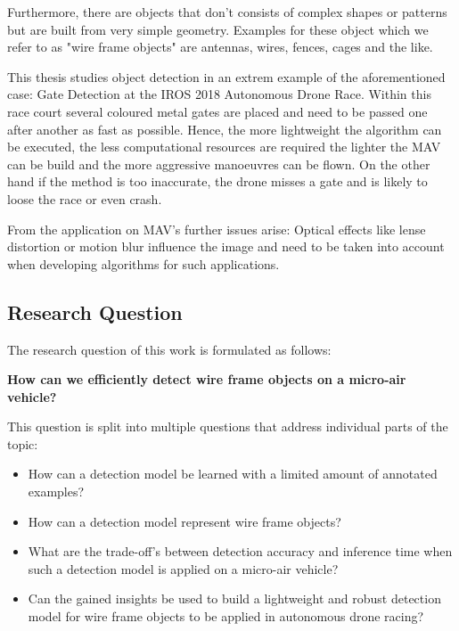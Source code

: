 Furthermore, there are objects that don't consists of complex shapes or patterns but are built from very simple geometry. Examples for these object which we refer to as "wire frame objects" are antennas, wires, fences, cages and the like.  

This thesis studies object detection in an extrem example of the aforementioned case: Gate Detection at the IROS 2018 Autonomous Drone Race. Within this race court several coloured metal gates are placed and need to be passed one after another as fast as possible. Hence, the more lightweight the algorithm can be executed, the less computational resources are required the lighter the \ac{MAV} can be build and the more aggressive manoeuvres can be flown. On the other hand if the method is too inaccurate, the drone misses a gate and is likely to loose the race or even crash.

From the application on MAV's further issues arise: Optical effects like lense distortion or motion blur influence the image and need to be taken into account when developing algorithms for such applications. 

\subsection*{Research Question}

The research question of this work is formulated as follows:
\begin{center}
	\textbf{How can we efficiently detect wire frame objects on a micro-air vehicle?}
\end{center}


This question is split into multiple questions that address individual parts of the topic:

\begin{itemize}
	\item How can a detection model be learned with a limited amount of annotated examples?
	\item How can a detection model represent wire frame objects?
	\item What are the trade-off's between detection accuracy and inference time when such a detection model is applied on a micro-air vehicle?
	\item Can the gained insights be used to build a lightweight and robust detection model for wire frame objects to be applied in autonomous drone racing?
\end{itemize}

